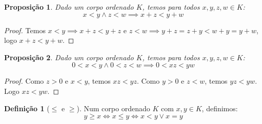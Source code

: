 \documentclass{article}
\theoremstyle{plain}
\newtheorem{prop}{Proposição}[section]
\theoremstyle{definition}
\newtheorem{definicao}{Definição}[section]
\theoremstyle{remark}
\begin{document}
\begin{prop}
	Dado um corpo ordenado $K$, temos para todos $x,y,z,w\in K$:
	$$ x<y \land z<w \implies x+z < y+w$$
\end{prop}
\begin{proof}
	Temos $x < y \implies x+z < y+z$ e $z<w \implies y+z = z+y < w+y = y +w$, logo $x+z < y+w$.
\end{proof}
\begin{prop}
	Dado um corpo ordenado $K$, temos para todos $x,y,z,w\in K$:
	$$ 0 < x<y \land 0<z<w \implies 0 < xz < yw$$
\end{prop}
\begin{proof}
	Como $z>0$  e $x<y$, temos $xz<yz$. Como $y>0$  e $z<w$, temos $yz < yw$. Logo $xz<yw$.
\end{proof}

\begin{definicao}[$\leq$ e $\geq$]
	Num corpo ordenado $K$ com $x,y \in K$, definimos:
	$$ y \geq x \iff  x\leq y \iff  x<y \lor x = y$$
\end{definicao}
\end{document}
